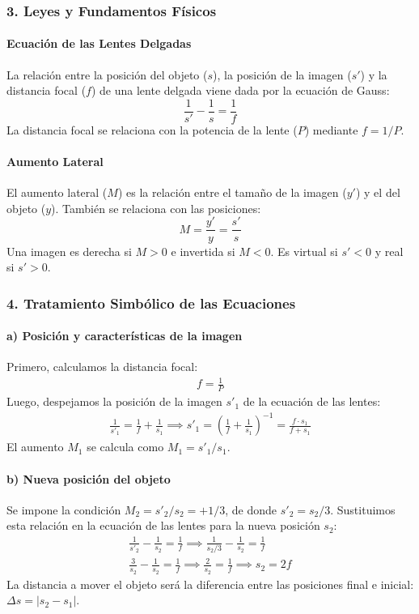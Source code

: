 \subsubsection*{3. Leyes y Fundamentos Físicos}
\paragraph*{Ecuación de las Lentes Delgadas}
La relación entre la posición del objeto ($s$), la posición de la imagen ($s'$) y la distancia focal ($f$) de una lente delgada viene dada por la ecuación de Gauss:
$$ \frac{1}{s'} - \frac{1}{s} = \frac{1}{f} $$
La distancia focal se relaciona con la potencia de la lente ($P$) mediante $f = 1/P$.

\paragraph*{Aumento Lateral}
El aumento lateral ($M$) es la relación entre el tamaño de la imagen ($y'$) y el del objeto ($y$). También se relaciona con las posiciones:
$$ M = \frac{y'}{y} = \frac{s'}{s} $$
Una imagen es derecha si $M>0$ e invertida si $M<0$. Es virtual si $s'<0$ y real si $s'>0$.

\subsubsection*{4. Tratamiento Simbólico de las Ecuaciones}
\paragraph*{a) Posición y características de la imagen}
Primero, calculamos la distancia focal:
\begin{gather}
    f = \frac{1}{P}
\end{gather}
Luego, despejamos la posición de la imagen $s'_1$ de la ecuación de las lentes:
\begin{gather}
    \frac{1}{s'_1} = \frac{1}{f} + \frac{1}{s_1} \implies s'_1 = \left( \frac{1}{f} + \frac{1}{s_1} \right)^{-1} = \frac{f \cdot s_1}{f + s_1}
\end{gather}
El aumento $M_1$ se calcula como $M_1 = s'_1 / s_1$.

\paragraph*{b) Nueva posición del objeto}
Se impone la condición $M_2 = s'_2 / s_2 = +1/3$, de donde $s'_2 = s_2/3$. Sustituimos esta relación en la ecuación de las lentes para la nueva posición $s_2$:
\begin{gather}
    \frac{1}{s'_2} - \frac{1}{s_2} = \frac{1}{f} \implies \frac{1}{s_2/3} - \frac{1}{s_2} = \frac{1}{f} \nonumber \\
    \frac{3}{s_2} - \frac{1}{s_2} = \frac{1}{f} \implies \frac{2}{s_2} = \frac{1}{f} \implies s_2 = 2f
\end{gather}
La distancia a mover el objeto será la diferencia entre las posiciones final e inicial: $\Delta s = |s_2 - s_1|$.

